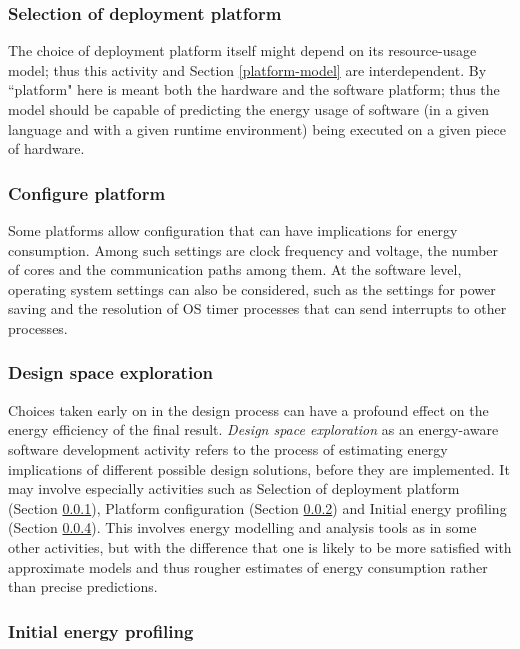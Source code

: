 \documentclass[oneside]{book}
\begin{document}
\subsubsection{Selection of deployment platform}\label{platform-choice}

The choice of deployment platform itself might depend on its resource-usage model; thus 
this activity and Section \ref{platform-model} are interdependent.
By ``platform"
here is meant both the hardware and the software platform; thus the model
should be capable of predicting the energy usage of software (in a given language
and with a given runtime environment) 
being executed on a given piece of hardware.

\subsubsection{Configure platform}\label{platform-config}

Some platforms allow configuration that can have implications for energy consumption.
Among such settings are clock frequency and voltage, the
number of cores and the communication paths among them. At the software level,
operating system settings can also be considered, such as the settings for power saving 
and the resolution of OS
timer processes that can send interrupts to other processes.


\subsubsection{Design space exploration}\label{space-expl}

Choices taken early on in the design process can have a profound effect on the
energy efficiency of the final result.  \emph{Design space exploration} as an 
energy-aware software development activity refers to the process of estimating
energy implications of different possible design solutions, before they are implemented.
It may involve especially activities such as Selection of deployment platform (Section \ref{platform-choice}), Platform configuration (Section \ref{platform-config}) and Initial energy profiling (Section \ref{init-energy}).
This involves energy modelling and analysis tools as in some other activities, but
with the difference that one is likely to be more satisfied with approximate models
and thus rougher estimates
of energy consumption rather than precise predictions.

\subsubsection{Initial energy profiling}\label{init-energy}
\end{document}
